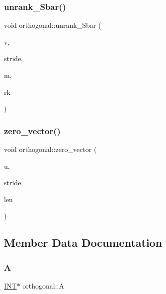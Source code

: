 \subsubsection{\texorpdfstring{unrank\+\_\+\+Sbar()}{unrank\_Sbar()}}
{\footnotesize\ttfamily void orthogonal\+::unrank\+\_\+\+Sbar (\begin{DoxyParamCaption}\item[{\mbox{\hyperlink{galois_8h_a09fddde158a3a20bd2dcadb609de11dc}{I\+NT}} $\ast$}]{v,  }\item[{\mbox{\hyperlink{galois_8h_a09fddde158a3a20bd2dcadb609de11dc}{I\+NT}}}]{stride,  }\item[{\mbox{\hyperlink{galois_8h_a09fddde158a3a20bd2dcadb609de11dc}{I\+NT}}}]{m,  }\item[{\mbox{\hyperlink{galois_8h_a09fddde158a3a20bd2dcadb609de11dc}{I\+NT}}}]{rk }\end{DoxyParamCaption})}

\mbox{\label{classorthogonal_ac549a3cc712c2e811ae33820f0ccd59a}} 
\subsubsection{\texorpdfstring{zero\+\_\+vector()}{zero\_vector()}}
{\footnotesize\ttfamily void orthogonal\+::zero\+\_\+vector (\begin{DoxyParamCaption}\item[{\mbox{\hyperlink{galois_8h_a09fddde158a3a20bd2dcadb609de11dc}{I\+NT}} $\ast$}]{u,  }\item[{\mbox{\hyperlink{galois_8h_a09fddde158a3a20bd2dcadb609de11dc}{I\+NT}}}]{stride,  }\item[{\mbox{\hyperlink{galois_8h_a09fddde158a3a20bd2dcadb609de11dc}{I\+NT}}}]{len }\end{DoxyParamCaption})}



\subsection{Member Data Documentation}
\mbox{\label{classorthogonal_ac6837d347449085603a8266185b58a55}} 
\subsubsection{\texorpdfstring{A}{A}}
{\footnotesize\ttfamily \mbox{\hyperlink{galois_8h_a09fddde158a3a20bd2dcadb609de11dc}{I\+NT}}$\ast$ orthogonal\+::A}

